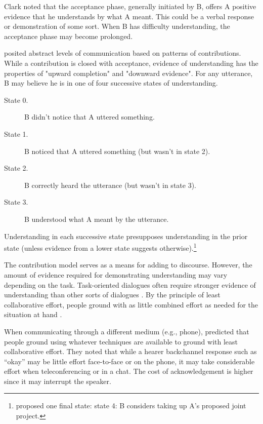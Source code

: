 Clark noted that the acceptance phase, generally initiated by B, offers A positive evidence that he understands by what A meant. This could be a verbal response or demonstration of some sort. When B has difficulty understanding, the acceptance phase may become prolonged.

\begin{sloppier}
\cite{Clark:1989ur} posited abstract levels of communication based on patterns of contributions. While a contribution is closed with acceptance, evidence of understanding has the properties of "upward completion" and "downward evidence". For any utterance, B may believe he is in one of four successive states of understanding.
\end{sloppier}
\begin{description}
\item[State 0.] B didn't notice that A uttered something.
\item[State 1.] B noticed that A uttered something  (but wasn't in state 2).
\item[State 2.] B correctly heard the utterance (but wasn't in state 3).
\item[State 3.] B understood what A meant by the utterance.
\end{description}

Understanding in each successive state presupposes understanding in the prior  state (unless evidence from a lower state suggests otherwise).\footnote{\citep{Clark:1996tm} proposed one final state: state 4: B considers taking up A's proposed joint project.} 

The contribution model serves as a means for adding to discourse. However, the amount of evidence required for demonstrating understanding may vary depending on the task. Task-oriented dialogues often require stronger evidence of understanding than other sorts of dialogues  \citep{Clark:1986uw}.  By the principle of least collaborative effort, people ground with as little combined effort as needed for the situation at hand  \citep{Brennan:1996ud}.  

When communicating through a different medium (e.g., phone),  \cite{Clark:2005wk}  predicted that people ground using whatever techniques are available to ground with least collaborative effort. They noted that while a hearer backchannel response such as ``okay'' may be little effort face-to-face or on the phone, it may take considerable effort when teleconferencing or in a chat. The cost of acknowledgement is higher since it may interrupt the speaker.
 
